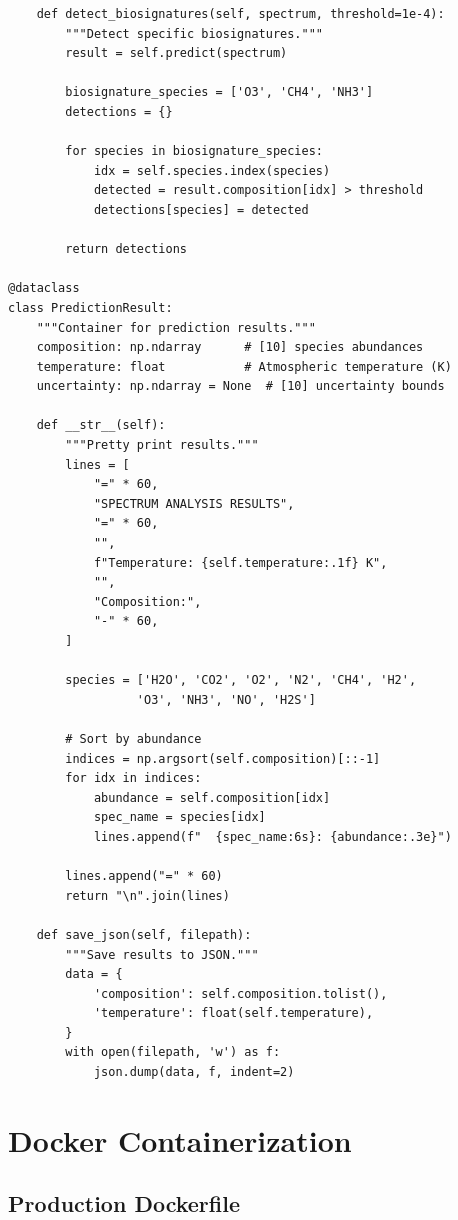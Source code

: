 \documentclass[12pt,a4paper,oneside]{report}
\begin{document}
\begin{lstlisting}
    def detect_biosignatures(self, spectrum, threshold=1e-4):
        """Detect specific biosignatures."""
        result = self.predict(spectrum)

        biosignature_species = ['O3', 'CH4', 'NH3']
        detections = {}

        for species in biosignature_species:
            idx = self.species.index(species)
            detected = result.composition[idx] > threshold
            detections[species] = detected

        return detections

@dataclass
class PredictionResult:
    """Container for prediction results."""
    composition: np.ndarray      # [10] species abundances
    temperature: float           # Atmospheric temperature (K)
    uncertainty: np.ndarray = None  # [10] uncertainty bounds

    def __str__(self):
        """Pretty print results."""
        lines = [
            "=" * 60,
            "SPECTRUM ANALYSIS RESULTS",
            "=" * 60,
            "",
            f"Temperature: {self.temperature:.1f} K",
            "",
            "Composition:",
            "-" * 60,
        ]

        species = ['H2O', 'CO2', 'O2', 'N2', 'CH4', 'H2',
                  'O3', 'NH3', 'NO', 'H2S']

        # Sort by abundance
        indices = np.argsort(self.composition)[::-1]
        for idx in indices:
            abundance = self.composition[idx]
            spec_name = species[idx]
            lines.append(f"  {spec_name:6s}: {abundance:.3e}")

        lines.append("=" * 60)
        return "\n".join(lines)

    def save_json(self, filepath):
        """Save results to JSON."""
        data = {
            'composition': self.composition.tolist(),
            'temperature': float(self.temperature),
        }
        with open(filepath, 'w') as f:
            json.dump(data, f, indent=2)
\end{lstlisting}

\section{Docker Containerization}

\subsection{Production Dockerfile}
\end{document}
